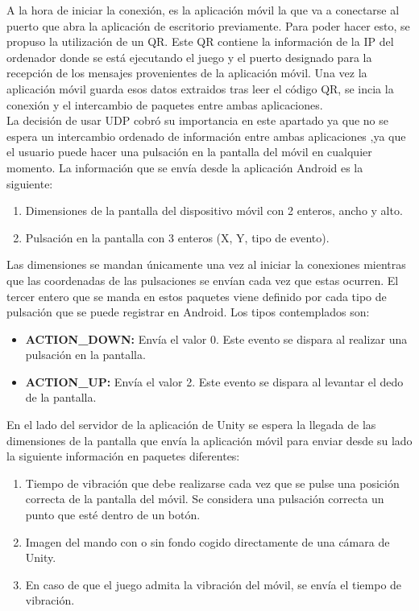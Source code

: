 A la hora de iniciar la conexi\'on, es la aplicaci\'on m\'ovil la que va a conectarse al puerto que abra la aplicaci\'on de escritorio previamente. Para poder hacer esto, se propuso la utilizaci\'on de un QR. Este QR contiene la informaci\'on de la IP del ordenador donde se est\'a ejecutando el juego y el puerto designado para la recepci\'on de los mensajes provenientes de la aplicaci\'on m\'ovil. Una vez la aplicaci\'on m\'ovil guarda esos datos extraidos tras leer el c\'odigo QR, se incia la conexi\'on y el intercambio de paquetes entre ambas aplicaciones.
\\
La decisi\'on de usar UDP cobr\'o su importancia en este apartado ya que no se espera un intercambio ordenado de informaci\'on entre ambas aplicaciones ,ya que el usuario puede hacer una pulsaci\'on en la pantalla del m\'ovil en cualquier momento. La informaci\'on que se env\'ia desde la aplicaci\'on Android es la siguiente:

\begin{enumerate}

\item Dimensiones de la pantalla del dispositivo m\'ovil con 2 enteros, ancho y alto.
\item Pulsaci\'on en la pantalla con 3 enteros (X, Y, tipo de evento). 

\end{enumerate}

Las dimensiones se mandan \'unicamente una vez al iniciar la conexiones mientras que las coordenadas de las pulsaciones se env\'ian cada vez que estas ocurren. El tercer entero que se manda en estos paquetes viene definido por cada tipo de pulsaci\'on que se puede registrar en Android. Los tipos contemplados son:
\begin{itemize} 
\item \textbf{ACTION\_DOWN:} Env\'ia el valor 0. Este evento se dispara al realizar una pulsaci\'on en la pantalla.
\item \textbf{ACTION\_UP:} Env\'ia el valor 2. Este evento se dispara al levantar el dedo de la pantalla.
\end{itemize}

En el lado del servidor de la aplicaci\'on de Unity se espera la llegada de las dimensiones de la pantalla que env\'ia la aplicaci\'on m\'ovil para enviar desde su lado la siguiente informaci\'on en paquetes diferentes:

\begin{enumerate}
\item Tiempo de vibraci\'on que debe realizarse cada vez que se pulse una posici\'on correcta de la pantalla del m\'ovil. Se considera una pulsaci\'on correcta un punto que est\'e dentro de un bot\'on.
\item Imagen del mando con o sin fondo cogido directamente de una c\'amara de Unity.
\item En caso de que el juego admita la vibraci\'on del m\'ovil, se env\'ia el tiempo de vibraci\'on.
\end {enumerate}

